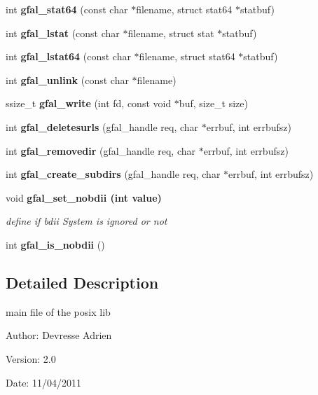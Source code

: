 \begin{CompactItemize}
\item 
int \textbf{gfal\_\-stat64} (const char $\ast$filename, struct stat64 $\ast$statbuf)\label{group__posix__group_gb40e2d23618763284ab4a1fb1a06a880}

\item 
int \textbf{gfal\_\-lstat} (const char $\ast$filename, struct stat $\ast$statbuf)\label{group__posix__group_g347f867802a33bc04fdfb769da857103}

\item 
int \textbf{gfal\_\-lstat64} (const char $\ast$filename, struct stat64 $\ast$statbuf)\label{group__posix__group_g739ca4985a67e0fc4fc253f42df2638c}

\item 
int \textbf{gfal\_\-unlink} (const char $\ast$filename)\label{group__posix__group_gdeb4c6cc47f507da3e3b498374e308fb}

\item 
ssize\_\-t \textbf{gfal\_\-write} (int fd, const void $\ast$buf, size\_\-t size)\label{group__posix__group_g00c2d64894ae81c05846b06c84727ae9}

\item 
int \textbf{gfal\_\-deletesurls} (gfal\_\-handle req, char $\ast$errbuf, int errbufsz)\label{gfal__posix_8c_72e48640200202bb9e9cf47e8a71f942}

\item 
int \textbf{gfal\_\-removedir} (gfal\_\-handle req, char $\ast$errbuf, int errbufsz)\label{gfal__posix_8c_8482ace6bde89a99f66d52bb66e012d9}

\item 
int \textbf{gfal\_\-create\_\-subdirs} (gfal\_\-handle req, char $\ast$errbuf, int errbufsz)\label{gfal__posix_8c_2a4f0aab963f1f1006953333907ecdbb}

\item 
void \bf{gfal\_\-set\_\-nobdii} (int value)
\begin{CompactList}\small\item\em define if bdii System is ignored or not \item\end{CompactList}\item 
int \textbf{gfal\_\-is\_\-nobdii} ()\label{group__internal__group_g0d2a0557bdb571ccb85c6ab5c05ae56f}

\end{CompactItemize}


\subsection{Detailed Description}
main file of the posix lib 

\begin{Desc}
\item[Author:]Devresse Adrien \end{Desc}
\begin{Desc}
\item[Version:]2.0 \end{Desc}
\begin{Desc}
\item[Date:]11/04/2011 \end{Desc}

